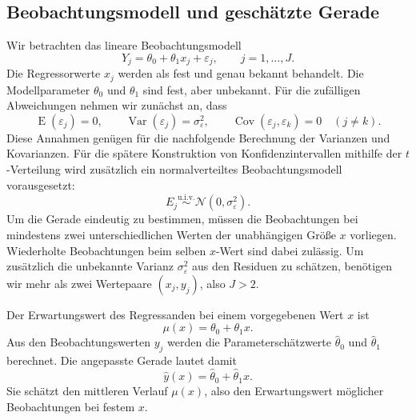 \subsection{Beobachtungsmodell und geschätzte Gerade}

Wir betrachten das lineare Beobachtungsmodell
\begin{equation}
  Y_j = \theta_0+\theta_1 x_j+\varepsilon_j,
  \qquad j=1,\ldots,J.
  \label{eq:band_beobachtungsmodell}
\end{equation}
Die Regressorwerte $x_j$ werden als fest und genau bekannt behandelt.
Die Modellparameter $\theta_0$ und $\theta_1$ sind fest, aber unbekannt.
Für die zufälligen Abweichungen nehmen wir zunächst an, dass
\begin{equation}
  \operatorname{E}(\varepsilon_j)=0,\qquad
  \operatorname{Var}(\varepsilon_j)=\sigma_\varepsilon^2,\qquad
  \operatorname{Cov}(\varepsilon_j,\varepsilon_k)=0\quad(j\ne k).
  \label{eq:band_momentannahmen}
\end{equation}
Diese Annahmen genügen für die nachfolgende Berechnung der Varianzen
und Kovarianzen. Für die spätere Konstruktion von Konfidenzintervallen
mithilfe der $t$-Verteilung wird zusätzlich ein normalverteiltes
Beobachtungsmodell vorausgesetzt:
\begin{equation}
  E_j\overset{\mathrm{u.i.v.}}{\sim}
  \mathcal{N}(0,\sigma_\varepsilon^2).
  \label{eq:band_normalmodell}
\end{equation}
Um die Gerade eindeutig zu bestimmen, müssen die Beobachtungen
bei mindestens zwei unterschiedlichen Werten der unabhängigen
Größe $x$ vorliegen. Wiederholte Beobachtungen beim selben
$x$-Wert sind dabei zulässig. Um zusätzlich die unbekannte
Varianz $\sigma_\varepsilon^2$ aus den Residuen zu schätzen, benötigen
wir mehr als zwei Wertepaare $(x_j,y_j)$, also $J>2$.


Der Erwartungswert des Regressanden bei einem vorgegebenen Wert $x$
ist
\begin{equation}
  \mu(x)=\theta_0+\theta_1 x.
\end{equation}
Aus den Beobachtungswerten $y_j$ werden die Parameterschätzwerte
$\widehat{\theta}_0$ und $\widehat{\theta}_1$ berechnet. Die angepasste
Gerade lautet damit
\begin{equation}
  \widehat{y}(x)
  =\widehat{\theta}_0+\widehat{\theta}_1 x.
  \label{eq:band_geschaetzte_gerade}
\end{equation}
Sie schätzt den mittleren Verlauf $\mu(x)$, also den Erwartungswert
möglicher Beobachtungen bei festem $x$.

